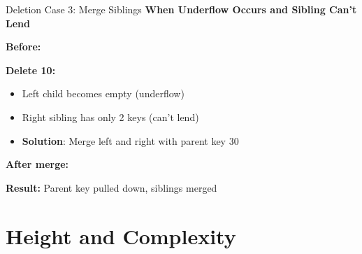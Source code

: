 \documentclass[aspectratio=169]{beamer}
\begin{document}
\begin{frame}{Deletion Case 3: Merge Siblings}
  \textbf{When Underflow Occurs and Sibling Can't Lend}

  \vspace{0.3cm}
  \textbf{Before:}
  \begin{center}
  \end{center}

  \textbf{Delete 10:}
  \begin{itemize}
    \item Left child becomes empty (underflow)
    \item Right sibling has only 2 keys (can't lend)
    \item \textbf{Solution}: Merge left and right with parent key 30
  \end{itemize}

  \vspace{0.2cm}
  \textbf{After merge:}
  \begin{center}
  \end{center}

  \textbf{Result:} Parent key pulled down, siblings merged
\end{frame}

\section{Height and Complexity}
\end{document}
